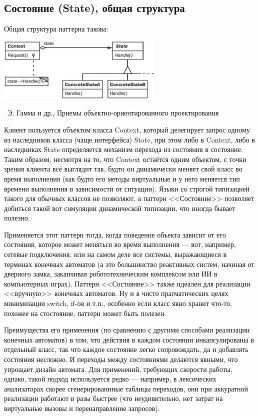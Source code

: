 \documentclass[a5paper]{article}
\newcommand{\attribution}[1] {
    \vspace{-5mm}\begin{flushright}\begin{scriptsize}%
    {\textcopyright\, #1}\end{scriptsize}\end{flushright}
}
\begin{document}
\subsection{Состояние (State), общая структура}

Общая структура паттерна такова:

\begin{center}
    \includegraphics[width=0.6\textwidth]{state.png}
    \attribution{Э. Гамма и др., Приемы объектно-ориентированного проектирования}
\end{center}

Клиент пользуется объектом класса Context, который делегирует запрос одному из наследников класса (чаще интерфейса) State, при этом либо в Context, либо в наследниках State определяется механизм перехода из состояния в состояние. Таким образом, несмотря на то, что Context остаётся одним объектом, с точки зрения клиента всё выглядит так, будто он динамически меняет свой класс во время выполнения (как будто его методы виртуальные и у него меняется тип времени выполнения в зависимости от ситуации). Языки со строгой типизацией такого для обычных классов не позволяют, а паттерн <<Состояние>> позволяет добиться такой вот симуляции динамической типизации, что иногда бывает полезно.

Применяется этот паттерн тогда, когда поведение объекта зависит от его состояния, которое может меняться во время выполнения --- вот, например, сетевые подключения, или на самом деле все системы, выражающиеся в терминах конечных автоматов (а это большинство реактивных систем, начиная от дверного замка, заканчивая робототехническим комплексом или ИИ в компьютерных играх). Паттерн <<Состояние>> также идеален для реализации <<вручную>> конечных автоматов. Ну и в чисто прагматических целях минимизации switch, if-ов и т.п., особенно если класс явно хранит что-то, похожее на стостояние, паттерн может быть полезен.

Преимущества его применения (по сравнению с другими способами реализации конечных автоматов) в том, что действия в каждом состоянии инкапсулированы в отдельный класс, так что каждое состояние легко сопровождать, да и добавлять состояния несложно. И переходы между состояниями делаются явными, что упрощает дизайн автомата. Для применений, требующих скорости работы, однако, такой подход используется редко --- например, в лексических анализаторах скорее сгенерированнные таблицы переходов, они при аккуратной реализации работают в разы быстрее (что неудивительно, нет затрат на виртуальные вызовы и перенаправление запросов).
\end{document}
